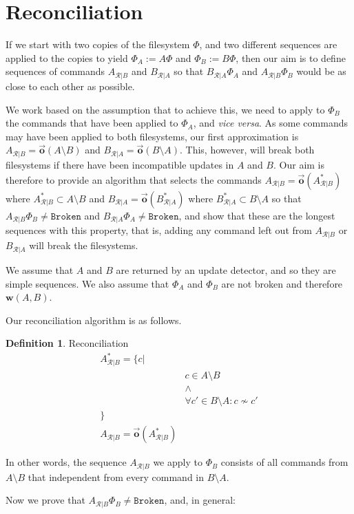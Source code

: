 \documentclass[12pt]{article}
\newcommand{\fsbroken}{\mathtt{Broken}} %
\newcommand{\FS}{\Phi} %
\newcommand{\indep}{\not\sim}
\newcommand{\works}[1]{{\mathbf{w}}({#1})}
\newcommand{\ordered}[1]{\vec{\mathbf{o}}({#1})}
\newcommand{\recchar}[3]{{#1}^{#3}_{\mathcal{R}|{#2}}}
\newcommand{\reca}{\recchar{A}{B}{}} %
\newcommand{\recb}{\recchar{B}{A}{}}
\newcommand{\recaset}{\recchar{A}{B}{*}}
\newcommand{\recbset}{\recchar{B}{A}{*}}
\theoremstyle{definition}
\newtheorem{mydef}{Definition}
\begin{document}
\section{Reconciliation}

If we start with two copies of the filesystem $\FS$,
and two different sequences are applied to the copies to yield $\FS_A:=A\FS$
and $\FS_B:=B\FS$, then our aim is to define sequences of commands $\reca$ and $\recb$
so that $\recb\FS_A$ and $\reca\FS_B$ would be as close to each other as possible.

We work based on the assumption that to achieve this, we need
to apply to $\FS_B$ the commands that have been applied to $\FS_A$, and \emph{vice versa}.
As some commands may have been applied to both filesystems, our first approximation
is $\reca = \ordered{A\setminus B}$ and $\recb = \ordered{B\setminus A}$.
This, however, will break both filesystems if there have been incompatible updates
in $A$ and $B$. 
Our aim is therefore to provide an algorithm that selects the commands 
$\reca = \ordered{\recaset}$  where $\recaset \subset A\setminus B$
and $\recb = \ordered{\recbset}$ where $\recbset \subset B\setminus A$ 
so that $\reca\FS_B\neq\fsbroken$ and $\recb\FS_A\neq\fsbroken$,
and show that these are the longest sequences with this property, that is,
adding any command left out from $\reca$ or $\recb$ will break the filesystems.

We assume that $A$ and $B$ are returned by an update detector,
and so they are simple sequences.
We also assume that $\FS_A$ and $\FS_B$ are not broken and therefore $\works{A,B}$.

Our reconciliation algorithm is as follows.

\begin{mydef}{Reconciliation}\label{def:reconciliation}
\begin{align*}
\recaset = \{c| & \\
& c\in A\setminus B \\
& \wedge \\
& \forall c'\in B\setminus A: c\indep c'\\
\} & \\
\reca = \ordered{\recaset}&
\end{align*}

In other words, the sequence $\reca$ we apply to $\FS_B$ consists of all commands from $A\setminus B$
that independent from every command in $B\setminus A$.
\end{mydef}

Now we prove that $\reca\FS_B\neq\fsbroken$, and, in general:
\end{document}
